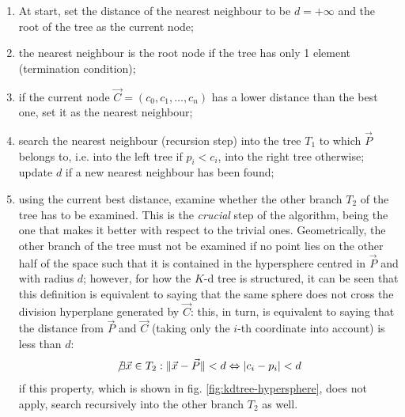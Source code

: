 \begin{enumerate}
  \item{At start, set the distance of the nearest neighbour to be $d=+\infty$
    and the root of the tree as the current node;}
  \item{the nearest neighbour is the root node if the tree has only 1 element
    (termination condition);}
  \item{if the current node $\vec{C}=\left(c_0,c_1,\dots,c_n\right)$ has a lower distance than the best one, set it as
    the nearest neighbour;}
  \item{search the nearest neighbour (recursion step) into the tree $T_1$ to which $\vec{P}$
      belongs to, i.e. into the left tree if $p_i < c_i$, into the right tree
    otherwise; update $d$ if a new nearest neighbour has been found;}
  \item{using the current best distance, examine whether the other branch $T_2$ of
      the tree has to be examined. This is the \emph{crucial} step of the
      algorithm, being the one that makes it better with respect to the trivial
    ones. Geometrically, the other branch of the tree must not be examined if no
    point lies on the other half of the space such that it is contained in the
    hypersphere centred in $\vec{P}$ and with radius $d$; however, for how the $K$-d
    tree is structured, it can be seen that this definition is equivalent to
    saying that the same sphere does not cross the division hyperplane generated
    by $\vec{C}$: this, in turn, is equivalent to saying that the distance from $\vec{P}$
    and $\vec{C}$ (taking only the $i$-th coordinate into account) is less than $d$:
    \begin{equation}
      \not \exists \vec{x} \in T_2 : \lVert \vec{x}-\vec{P} \rVert < d
      \Leftrightarrow \lvert c_i-p_i \rvert < d
    \end{equation}
    if this property, which is shown in fig. \ref{fig:kdtree-hypersphere}, does not apply, search recursively into the other branch
  $T_2$ as well.}
\end{enumerate}

